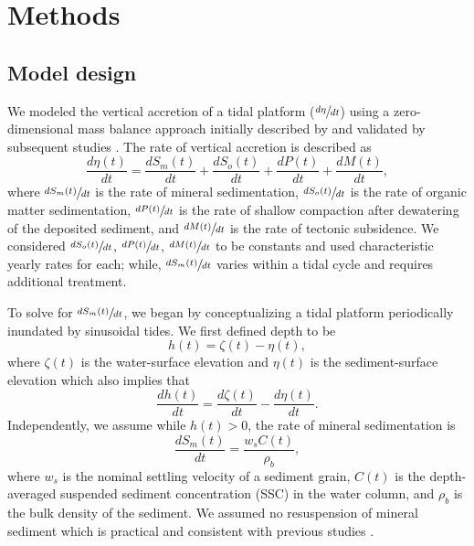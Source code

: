 \section{Methods}

\subsection{Model design}

We modeled the vertical accretion of a tidal platform ($\sfrac{d\eta}{dt}$) using a zero-dimensional mass balance approach initially described by \citet{kroneMethodSimulatingMarsh1987} and validated by subsequent studies \citep{allenSaltmarshGrowthStratification1990,frenchNumericalSimulationVertical1993,temmermanModellingLongtermTidal2003,temmermanModellingEstuarineVariations2004}. The rate of vertical accretion is described as
\begin{equation}\label{eq:mass_bal}
	\frac{d\eta(t)}{dt} = \frac{dS_m(t)}{dt} + \frac{dS_o(t)}{dt} + \frac{dP(t)}{dt} + \frac{dM(t)}{dt},
\end{equation}
where $\sfrac{dS_m(t)}{dt}$ is the rate of mineral sedimentation, $\sfrac{dS_o(t)}{dt}$ is the rate of organic matter sedimentation, $\sfrac{dP(t)}{dt}$ is the rate of shallow compaction after dewatering of the deposited sediment, and $\sfrac{dM(t)}{dt}$ is the rate of tectonic subsidence. We considered $\sfrac{dS_o(t)}{dt}$, $\sfrac{dP(t)}{dt}$, $\sfrac{dM(t)}{dt}$ to be constants and used characteristic yearly rates for each; while, $\sfrac{dS_m(t)}{dt}$ varies within a tidal cycle \citep{haleSeasonalVariabilityForces2019} and requires additional treatment.

To solve for $\sfrac{dS_m(t)}{dt}$, we began by conceptualizing a tidal platform periodically inundated by sinusoidal tides. We first defined depth to be
\begin{equation}\label{eq:depth}
	h(t) = \zeta(t) - \eta(t),
\end{equation}
where $\zeta(t)$ is the water-surface elevation and $\eta(t)$ is the sediment-surface elevation which also implies that
\begin{equation}\label{eq:depth_dt}
	\frac{dh(t)}{dt} = \frac{d\zeta(t)}{dt} - \frac{d\eta(t)}{dt}.
\end{equation}
Independently, we assume while $h(t) > 0$, the rate of mineral sedimentation is
\begin{equation}\label{eq:sed_flux}
	\frac{dS_m(t)}{dt} = \frac{w_sC(t)}{\rho_b},
\end{equation}
where $w_s$ is the nominal settling velocity of a sediment grain, $C(t)$ is the depth-averaged suspended sediment concentration (SSC) in the water column, and $\rho_b$ is the bulk density of the sediment. We assumed no resuspension of mineral sediment which is practical and consistent with previous studies \citep{kroneMethodSimulatingMarsh1987, allenSaltmarshGrowthStratification1990, frenchNumericalSimulationVertical1993, temmermanModellingLongtermTidal2003, temmermanModellingEstuarineVariations2004}.

